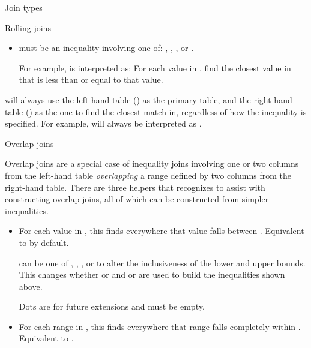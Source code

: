 \documentclass[a4paper]{book}
\begin{document}
\begin{Section}{Join types}
\begin{SubSection}{Rolling joins}
\begin{itemize}
\item{} 

 must be an inequality involving one of: \code{>}, \code{>=}, \code{<}, or \code{<=}.

For example,  is interpreted as: For each value in ,
find the closest value in  that is less than or equal to that  value.

\end{itemize}


 will always use the left-hand table () as the primary table,
and the right-hand table () as the one to find the closest match in,
regardless of how the inequality is specified. For example,
 will always be interpreted as .
\end{SubSection}


%
\begin{SubSection}{Overlap joins}

Overlap joins are a special case of inequality joins involving one or two
columns from the left-hand table \emph{overlapping} a range defined by two columns
from the right-hand table. There are three helpers that 
recognizes to assist with constructing overlap joins, all of which can be
constructed from simpler inequalities.
\begin{itemize}

\item{} 

For each value in , this finds everywhere that value falls between
. Equivalent to  by
default.

 can be one of , \code{"[)"}, \code{"(]"}, or
 to alter the inclusiveness of the lower and upper bounds. This
changes whether \code{>=} or \code{>} and \code{<=} or \code{<} are used to build the
inequalities shown above.

Dots are for future extensions and must be empty.
\item{} 

For each range in , this finds everywhere that range
falls completely within . Equivalent to .


\end{itemize}
\end{SubSection}
\end{Section}
\end{document}
